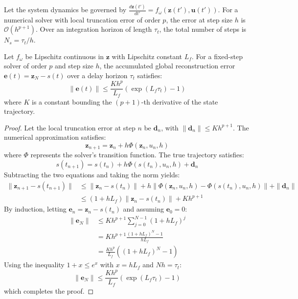 \documentclass[manuscript, screen, review]{jair}
\begin{document}
Let the system dynamics be governed by $\frac{d\mathbf{z}(t')}{dt'} = f_\omega(\mathbf{z}(t'), \mathbf{u}(t'))$. For a numerical solver with local truncation error of order $p$, the error at step size $h$ is $\mathcal{O}(h^{p+1})$. Over an integration horizon of length $\tau_t$, the total number of steps is $N_s = \tau_t / h$.

\begin{theorem}\label{thm:ode_global_error}
Let $f_\omega$ be Lipschitz continuous in $\mathbf{z}$ with Lipschitz constant $L_f$. For a fixed-step solver of order $p$ and step size $h$, the accumulated global reconstruction error $\mathbf{e}(t) = \mathbf{z}_N - s(t)$ over a delay horizon $\tau_t$ satisfies:
\begin{equation}
    \| \mathbf{e}(t) \| \le \frac{K h^p}{L_f} \left( \exp\left( L_f \tau_t \right) - 1 \right)
\end{equation}
where $K$ is a constant bounding the $(p+1)$-th derivative of the state trajectory.
\end{theorem}

\begin{proof}
Let the local truncation error at step $n$ be $\mathbf{d}_n$, with $\|\mathbf{d}_n\| \le K h^{p+1}$. The numerical approximation satisfies:
\begin{equation*}
    \mathbf{z}_{n+1} = \mathbf{z}_n + h \Phi(\mathbf{z}_n, u_n, h)
\end{equation*}
where $\Phi$ represents the solver's transition function. The true trajectory satisfies:
\begin{equation*}
    s(t_{n+1}) = s(t_n) + h \Phi(s(t_n), u_n, h) + \mathbf{d}_n
\end{equation*}
Subtracting the two equations and taking the norm yields:
\begin{align*}
    \| \mathbf{z}_{n+1} - s(t_{n+1}) \| &\le \| \mathbf{z}_n - s(t_n) \| + h \| \Phi(\mathbf{z}_n, u_n, h) - \Phi(s(t_n), u_n, h) \| + \| \mathbf{d}_n \| \\
    &\le (1 + h L_f) \| \mathbf{z}_n - s(t_n) \| + K h^{p+1}
\end{align*}
By induction, letting $\mathbf{e}_n = \mathbf{z}_n - s(t_n)$ and assuming $\mathbf{e}_0 = 0$:
\begin{align*}
    \| \mathbf{e}_N \| &\le K h^{p+1} \sum_{j=0}^{N-1} (1 + h L_f)^j \\
    &= K h^{p+1} \frac{(1 + h L_f)^N - 1}{h L_f} \\
    &= \frac{K h^p}{L_f} \left( (1 + h L_f)^N - 1 \right)
\end{align*}
Using the inequality $1 + x \le e^x$ with $x = h L_f$ and $N h = \tau_t$:
\begin{equation*}
    \| \mathbf{e}_N \| \le \frac{K h^p}{L_f} \left( \exp\left( L_f \tau_t \right) - 1 \right)
\end{equation*}
which completes the proof.
\end{proof}
\end{document}
